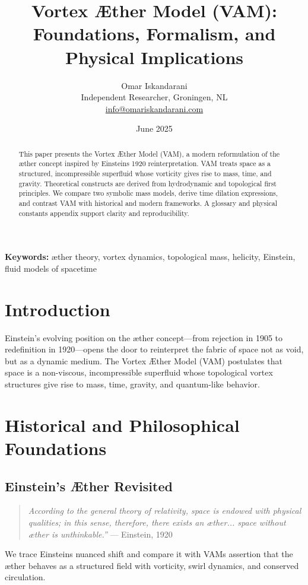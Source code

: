 \documentclass[12pt]{article}
\title{Vortex Æther Model (VAM): Foundations, Formalism, and Physical Implications}
\author{Omar Iskandarani \\ Independent Researcher, Groningen, NL \\ \href{mailto:info@omariskandarani.com}{info@omariskandarani.com}}
\date{June 2025}
\begin{document}
    \maketitle

    \begin{abstract}
        This paper presents the Vortex Æther Model (VAM), a modern reformulation of the æther concept inspired by Einstein\rqs s 1920 reinterpretation. VAM treats space as a structured, incompressible superfluid whose vorticity gives rise to mass, time, and gravity. Theoretical constructs are derived from hydrodynamic and topological first principles. We compare two symbolic mass models, derive time dilation expressions, and contrast VAM with historical and modern frameworks. A glossary and physical constants appendix support clarity and reproducibility.
    \end{abstract}

    \vspace{0.5cm}
    \textbf{Keywords:} æther theory, vortex dynamics, topological mass, helicity, Einstein, fluid models of spacetime

    \newpage
    \tableofcontents
    \newpage

    \section{Introduction}
    Einstein's evolving position on the æther concept—from rejection in 1905 to redefinition in 1920—opens the door to reinterpret the fabric of space not as void, but as a dynamic medium. The Vortex Æther Model (VAM) postulates that space is a non-viscous, incompressible superfluid whose topological vortex structures give rise to mass, time, gravity, and quantum-like behavior.

    \section{Historical and Philosophical Foundations}
    \subsection{Einstein's Æther Revisited}
    \begin{quote}
        \textit{\grqq According to the general theory of relativity, space is endowed with physical qualities; in this sense, therefore, there exists an æther... space without æther is unthinkable.\textquotedblright} — Einstein, 1920
    \end{quote}
    We trace Einstein\rqs s nuanced shift and compare it with VAM\rqs s assertion that the æther behaves as a structured field with vorticity, swirl dynamics, and conserved circulation.
\end{document}

